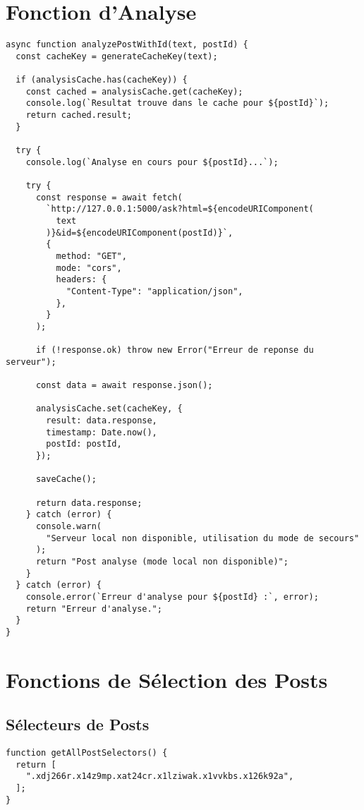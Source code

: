 \documentclass[12pt,a4paper]{article}
\begin{document}
\section{Fonction d'Analyse}

\begin{lstlisting}
async function analyzePostWithId(text, postId) {
  const cacheKey = generateCacheKey(text);

  if (analysisCache.has(cacheKey)) {
    const cached = analysisCache.get(cacheKey);
    console.log(`Resultat trouve dans le cache pour ${postId}`);
    return cached.result;
  }

  try {
    console.log(`Analyse en cours pour ${postId}...`);

    try {
      const response = await fetch(
        `http://127.0.0.1:5000/ask?html=${encodeURIComponent(
          text
        )}&id=${encodeURIComponent(postId)}`,
        {
          method: "GET",
          mode: "cors",
          headers: {
            "Content-Type": "application/json",
          },
        }
      );

      if (!response.ok) throw new Error("Erreur de reponse du serveur");

      const data = await response.json();

      analysisCache.set(cacheKey, {
        result: data.response,
        timestamp: Date.now(),
        postId: postId,
      });

      saveCache();

      return data.response;
    } catch (error) {
      console.warn(
        "Serveur local non disponible, utilisation du mode de secours"
      );
      return "Post analyse (mode local non disponible)";
    }
  } catch (error) {
    console.error(`Erreur d'analyse pour ${postId} :`, error);
    return "Erreur d'analyse.";
  }
}
\end{lstlisting}

\section{Fonctions de Sélection des Posts}

\subsection{Sélecteurs de Posts}

\begin{lstlisting}
function getAllPostSelectors() {
  return [
    ".xdj266r.x14z9mp.xat24cr.x1lziwak.x1vvkbs.x126k92a",
  ];
}
\end{lstlisting}
\end{document}
